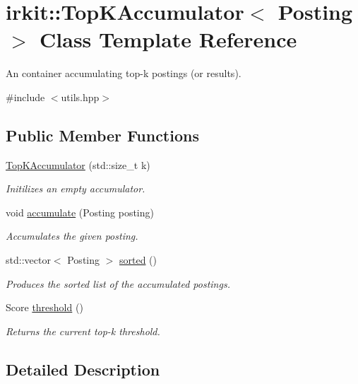 \hypertarget{classirkit_1_1TopKAccumulator}{}\section{irkit\+:\+:Top\+K\+Accumulator$<$ Posting $>$ Class Template Reference}
\label{classirkit_1_1TopKAccumulator}


An container accumulating top-\/k postings (or results).  




{\ttfamily \#include $<$utils.\+hpp$>$}

\subsection*{Public Member Functions}
\begin{DoxyCompactItemize}
\item 
\hyperlink{classirkit_1_1TopKAccumulator_a74e1ee880b5d081bc0a3ba0e7fcdb1e3}{Top\+K\+Accumulator} (std\+::size\+\_\+t k)
\begin{DoxyCompactList}\small\item\em Initilizes an empty accumulator. \end{DoxyCompactList}\item 
void \hyperlink{classirkit_1_1TopKAccumulator_a6caae6de2f8f555b4ad728d8819d1633}{accumulate} (Posting posting)
\begin{DoxyCompactList}\small\item\em Accumulates the given posting. \end{DoxyCompactList}\item 
std\+::vector$<$ Posting $>$ \hyperlink{classirkit_1_1TopKAccumulator_adde0cfe7ba7dc26ca2cc55422b2351fa}{sorted} ()
\begin{DoxyCompactList}\small\item\em Produces the sorted list of the accumulated postings. \end{DoxyCompactList}\item 
Score \hyperlink{classirkit_1_1TopKAccumulator_abe812895292f04ad6cdcebe3f0864d30}{threshold} ()
\begin{DoxyCompactList}\small\item\em Returns the current top-\/k threshold. \end{DoxyCompactList}\end{DoxyCompactItemize}


\subsection{Detailed Description}
